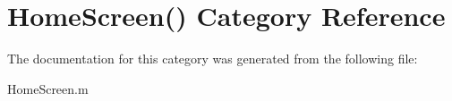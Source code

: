 \hypertarget{category_home_screen_07_08}{\section{Home\+Screen() Category Reference}
\label{category_home_screen_07_08}
}


The documentation for this category was generated from the following file\+:\begin{DoxyCompactItemize}
\item 
Home\+Screen.\+m\end{DoxyCompactItemize}
